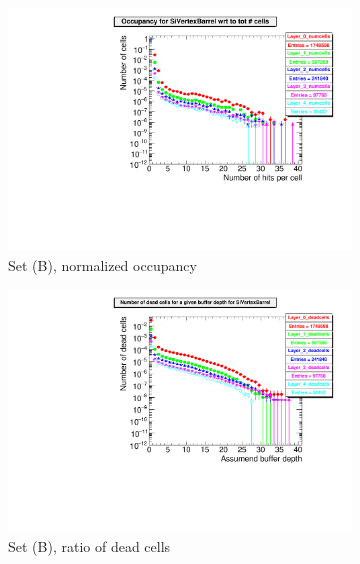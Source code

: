   \begin{figure}[htb]\ContinuedFloat
     \begin{subfigure}[b]{0.49\textwidth}
   \centering
    \includegraphics[width=\textwidth]{Figures/Pairs/Appendix/occupancy_numcells_SiVertexBarrel_ILC250_SetB.pdf}
   \caption{Set (B), normalized occupancy}
   \end{subfigure}
   \hfill
    \begin{subfigure}[b]{0.49\textwidth}
   \centering
    \includegraphics[width=\textwidth]{Figures/Pairs/Appendix/occupancy_deadcells_SiVertexBarrel_ILC250_SetB.pdf}
    \caption{Set (B), ratio of dead cells}
   \end{subfigure}\\
     \begin{subfigure}[b]{0.49\textwidth}
   \centering

\end{subfigure}
\end{figure}
